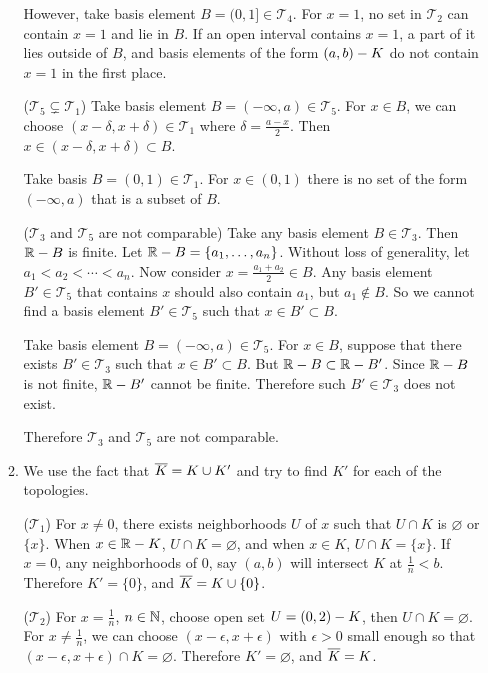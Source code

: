 \documentclass[12pt]{report}
\newcommand{\subprob}[1]{\item[\textbf{\sffamily (#1)}]}
\newcommand{\T}{\mathcal{T}}
\begin{document}
\begin{enumerate}
\begin{enumerate}
        However, take basis element \(B = (0, 1] \in \T_4\). For \(x = 1\), no set in \(\T_2\) can contain \(x = 1\) and lie in \(B\). If an open interval contains \(x = 1\), a part of it lies outside of \(B\), and basis elements of the form \((a, b) - K\) do not contain \(x = 1\) in the first place.

        \medskip

        (\(\T_5 \subsetneq \T_1\)) Take basis element \(B = (-\infty, a) \in \T_5\). For \(x \in B\), we can choose \((x - \delta, x + \delta) \in \T_1\) where \(\delta = \frac{a-x}{2}\). Then \(x \in (x - \delta, x + \delta) \subset B\).

        Take basis \(B = (0, 1) \in \T_1\). For \(x \in (0, 1)\) there is no set of the form \((-\infty, a)\) that is a subset of \(B\).

        \medskip

        (\(\T_3\) and \(\T_5\) are not comparable) Take any basis element \(B \in \T_3\). Then \(\mathbb{R} - B\) is finite. Let \(\mathbb{R} - B = \{a_1, \dots, a_n\}\). Without loss of generality, let \(a_1 < a_2 < \cdots < a_n\). Now consider \(x = \frac{a_1 + a_2}{2} \in B\). Any basis element \(B' \in \T_5\) that contains \(x\) should also contain \(a_1\), but \(a_1 \notin B\). So we cannot find a basis element \(B' \in \T_5\) such that \(x \in B' \subset B\).

        Take basis element \(B = (-\infty, a) \in \T_5\). For \(x \in B\), suppose that there exists \(B' \in \T_3\) such that \(x \in B' \subset B\). But \(\mathbb{R} - B \subset \mathbb{R} - B'\). Since \(\mathbb{R} - B\) is not finite, \(\mathbb{R} - B'\) cannot be finite. Therefore such \(B' \in \T_3\) does not exist.

        Therefore \(\T_3\) and \(\T_5\) are not comparable.

        \subprob{b} We use the fact that \(\overline{K} = K \cup K'\) and try to find \(K'\) for each of the topologies.

        \medskip

        (\(\T_1\)) For \(x \neq 0\), there exists neighborhoods \(U\) of \(x\) such that \(U \cap K\) is \(\varnothing\) or \(\{x\}\). When \(x \in \mathbb{R} - K\), \(U \cap K = \varnothing\), and when \(x \in K\), \(U \cap K = \{x\}\). If \(x = 0\), any neighborhoods of \(0\), say \((a, b)\) will intersect \(K\) at \(\frac{1}{n} < b\). Therefore \(K' = \{0\}\), and \(\overline{K} = K \cup \{0\}\).

        \medskip

        (\(\T_2\)) For \(x = \frac{1}{n}\), \(n \in \mathbb{N}\), choose open set \(U = (0, 2) - K\), then \(U \cap K = \varnothing\). For \(x \neq \frac{1}{n}\), we can choose \((x - \epsilon, x + \epsilon)\) with \(\epsilon > 0\) small enough so that \((x - \epsilon, x + \epsilon) \cap K = \varnothing\). Therefore \(K' = \varnothing\), and \(\overline{K} = K\).


\end{enumerate}
\end{enumerate}
\end{document}
